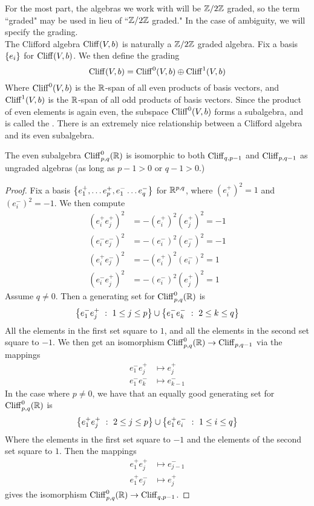%
For the most part, the algebras we work with will be $\mathbb{Z}/2\mathbb{Z}$ graded, so
the term ``graded" may be used in lieu of ``$\mathbb{Z}/2\mathbb{Z}$ graded." In the case of
ambiguity, we will specify the grading. \\
The Clifford algebra $\operatorname{Cliff}(V,b)$ is naturally a $\mathbb{Z}/2\mathbb{Z}$ graded algebra. Fix
a basis $\left\lbrace e_i \right\rbrace$ for $\operatorname{Cliff}(V,b)$. We then define the grading
\[
\operatorname{Cliff}(V,b) = \operatorname{Cliff}^0(V,b) \oplus \operatorname{Cliff}^1(V,b)
\]
Where $\operatorname{Cliff}^0(V,b)$ is the $\mathbb{R}$-span of all even products of basis vectors,
and $\operatorname{Cliff}^1(V,b)$ is the $\mathbb{R}$-span of all odd products of basis vectors.
Since the product of even elements is again even, the subspace
$\operatorname{Cliff}^0(V,b)$ forms a subalgebra, and is called the . There is an extremely nice relationship between a Clifford algebra
and its even subalgebra.
%
\begin{thm}
The even subalgebra $\operatorname{Cliff}_{p,q}^0(\mathbb{R})$ is isomorphic to both $\operatorname{Cliff}_{q, p-1}$
and $\operatorname{Cliff}_{p,q-1}$ as ungraded algebras (as long as $p-1 > 0$ or $q-1 > 0$.)
\end{thm}
%
\begin{proof}
Fix a basis $\left\lbrace e_1^+, \ldots e_p^+, e_1^- \ldots e_q^- \right\rbrace$ for $\mathbb{R}^{p,q}$, where
$(e_i^+)^2 = 1$ and $(e_i^-)^2 = -1$. We then compute
%
\begin{align*}
(e_i^+e_j^+)^2 &= -(e_i^+)^2(e_j^+)^2 = -1 \\
(e_i^-e_j^-)^2 &= -(e_i^-)^2(e_j^-)^2 = -1 \\
(e_i^+e_j^-)^2 &= -(e_i^+)^2(e_i^-)^2 = 1 \\
(e_i^-e_j^+)^2 &= -(e_i^-)^2(e_j^+)^2 = 1
\end{align*}
%
Assume $q \neq 0$. Then a generating set for $\operatorname{Cliff}_{p,q}^0(\mathbb{R})$ is
\[
\left\lbrace e_1^-e_j^+ ~:~ 1 \leq j \leq p \right\rbrace \cup \left\lbrace e_1^-e_k^- ~:~ 2 \leq k \leq q \right\rbrace
\]
All the elements in the first set square to $1$, and all the elements in the
second set square to $-1$. We then get an isomorphism
$\operatorname{Cliff}^0_{p,q}(\mathbb{R}) \to \operatorname{Cliff}_{p,q-1}$ via the mappings
\begin{align*}
e_1^-e_j^+ &\mapsto e_j^+ \\
e_1^-e_k^- &\mapsto e_{k-1}^-
\end{align*}
In the case where $p \neq 0$, we have that an equally good generating set for
$\operatorname{Cliff}_{p,q}^0(\mathbb{R})$ is
\[
\left\lbrace e^+_1e_j^+ ~:~ 2 \leq j \leq p \right\rbrace \cup \left\lbrace e_1^+e_i^- ~:~ 1 \leq i \leq q \right\rbrace
\]
Where the elements in the first set square to $-1$ and the elements of the second
set square to $1$. Then the mappings
\begin{align*}
e_1^+e_j^+ &\mapsto e_{j-1}^- \\
e_1^+e_j^- &\mapsto e_j^+
\end{align*}
gives the isomorphism $\operatorname{Cliff}_{p,q}^0(\mathbb{R}) \to \operatorname{Cliff}_{q, p-1}$.
\end{proof}
